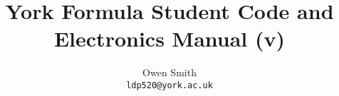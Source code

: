 \documentclass[12pt]{article}
\title{York Formula Student Code and Electronics Manual (v\vhCurrentVersion)}
\date{\vhCurrentDate}
\author{
  Owen Smith\\
  \texttt{ldp520@york.ac.uk}
}
\begin{document}
\maketitle
\tableofcontents

\begin{versionhistory}
\end{versionhistory}
\end{document}
